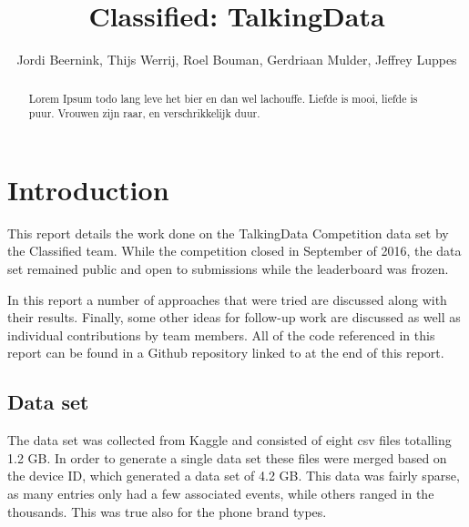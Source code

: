 \documentclass[runningheads,a4paper]{llncs}
\begin{document}
\mainmatter 

\title{Classified: TalkingData}


\author{Jordi Beernink, Thijs Werrij, Roel Bouman, Gerdriaan Mulder, Jeffrey Luppes}



\tocauthor{{}}

\maketitle

\begin{abstract}
Lorem Ipsum todo lang leve het bier en dan wel lachouffe. Liefde is mooi, liefde is puur. Vrouwen zijn raar, en verschrikkelijk duur. 
\end{abstract}

\medskip

\begingroup
\let\clearpage\relax
\tableofcontents
{}
\endgroup

\medskip
\medskip

\section{Introduction}
This report details the work done on the TalkingData Competition data set by the Classified team. While the competition closed in September of 2016,  the data set remained public and open to submissions while the leaderboard was frozen.

In this report a number of approaches that were tried are discussed along with their results. Finally, some other ideas for follow-up work are discussed as well as individual contributions by team members. All of the code referenced in this report can be found in a Github repository linked to at the end of this report. 

\subsection{Data set}
The data set was collected from Kaggle and consisted of eight csv files totalling 1.2 GB. In order to generate a single data set these files were merged based on the device ID, which generated a data set of 4.2 GB. This data was fairly sparse, as many entries only had a few associated events, while others ranged in the thousands. This was true also for the phone brand types. 
\medskip
\end{document}
